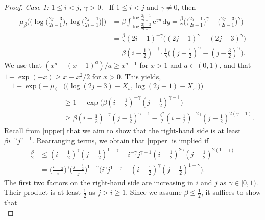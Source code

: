 \documentclass[10pt,a4paper]{amsart}
\newcommand{\rd}{\mathrm{d}}
\newcommand{\re}{{\mathrm e}}
\begin{document}
\begin{proof}
    \smallskip 
    \noindent\emph{Case 1: $1\le i<j$, $\gamma>0$.\ }
	If $1\le i<j$ and $\gamma\neq 0$, then 
	\begin{align}
		\mu_\beta \Big( (\log \big(\tfrac{2j-3}{2i-1}\big), \log \big(\tfrac{2j-1}{2i-1}\big) \big]\Big)
		 & = \beta \int_{\log \frac{2j-3}{2i-1}}^{\log \frac{2j-1}{2i-1}}
		\re^{\gamma y} \, \rd y
		= \tfrac\beta\gamma \Big(\big(\tfrac{2j-1}{2i-1}\big)^\gamma-\big(\tfrac{2j-3}{2i-1}\big)^\gamma \Big)                                                \label{upper-int} \\
		 & =\tfrac\beta\gamma  (2i-1)^{-\gamma}\Big((2j-1)^\gamma-(2j-3)^{\gamma}\Big) \nonumber\\&= \beta(i-\tfrac12 )^{-\gamma}\cdot\tfrac{1}{\gamma}\Big((j-\tfrac12 )^\gamma-(j-\tfrac32)^{\gamma}\Big).\nonumber
	\end{align}
    We use that $(x^a-(x-1)^a)/a\ge x^{a-1}$ for $x>1$ and $a\in(0,1)$, and that $1-\exp(-x)\ge x-x^2/2$ for $x>0$. This yields,
    \begin{align}
    1-\exp\Big(-\mu_\beta
		&\big( (\log (2j-3) -X_{s}, \log(2j-1) -X_{s}]\big)\Big)\nonumber\\
        &\ge
        1-\exp\Big(\beta(i-\tfrac12 )^{-\gamma}(j-\tfrac12 )^{\gamma-1}\Big) \label{eq:upper-12}\\
        &\ge \beta(i-\tfrac12 )^{-\gamma}(j-\tfrac12 )^{\gamma-1} - \tfrac{\beta^2}{2}(i-\tfrac12 )^{-2\gamma}(j-\tfrac12 )^{2(\gamma-1)}.\nonumber
        \end{align}
    Recall from \eqref{upper} that we aim to show that the right-hand side is at least $\beta i^{-\gamma}j^{\gamma-1}$. Rearranging terms, we obtain that \eqref{upper} is implied if 
    \begin{equation}\nonumber
    \begin{aligned}
    \tfrac{\beta}{2}&\le (i-\tfrac12 )^{\gamma}(j-\tfrac12 )^{1-\gamma}-i^{-\gamma}j^{\gamma-1}(i-\tfrac12 )^{2\gamma}(j-\tfrac12 )^{2(1-\gamma)} \\
    &= \big(\tfrac{i-\frac12 }{i}\big)^{\gamma}\big(\tfrac{j-\frac12 }{j}\big)^{1-\gamma}\Big(i^\gamma j^{1-\gamma} - (i-\tfrac12 )^{\gamma}(j-\tfrac12 )^{1-\gamma}\Big).
    \end{aligned}
    \end{equation}
    The first two factors on the right-hand side are increasing in $i$ and $j$ as $\gamma\in[0,1)$. Their product is at least $\tfrac12 $ as $j>i\ge 1$. Since we assume $\beta\le \tfrac12 $, it suffices to show that 
    \begin{equation}\label{eq:1ijgamma}

\end{equation}
\end{proof}
\end{document}
